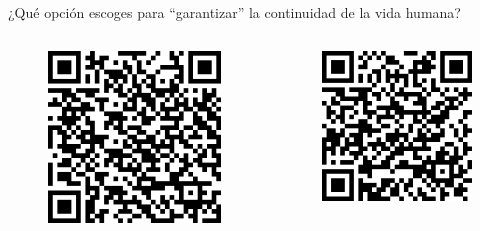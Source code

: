 \documentclass[aspectratio=169]{beamer}
\begin{document}
\begin{frame}
\huge
\centering
¿Qué opción escoges para ``garantizar'' la continuidad de la vida humana?\\
\begin{columns}
\begin{column}{0.5\textwidth}
\begin{figure}
\includegraphics[width=.35\textwidth]{QR_adaptarnos.png}
\end{figure}   
\end{column}
\begin{column}{0.5\textwidth}
\begin{figure}
\includegraphics[width=.35\textwidth]{QR_revertir.png}
\end{figure}   
\end{column}
\end{columns}
\end{frame}
\end{document}
